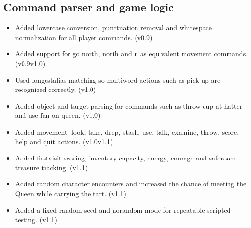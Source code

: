 \documentclass[letterpaper,10pt,english]{sphinxmanual}
\begin{document}
\subsection{Command parser and game logic}
\label{\detokenize{AssignmentFour/main:command-parser-and-game-logic}}\begin{itemize}
\item {} 
\sphinxAtStartPar
Added lowercase conversion, punctuation removal and whitespace normalization for all player commands. (v0.9)

\item {} 
\sphinxAtStartPar
Added support for go north, north and n as equivalent movement commands. (v0.9\sphinxhyphen{}v1.0)

\item {} 
\sphinxAtStartPar
Used longest\sphinxhyphen{}alias matching so multiword actions such as pick up are recognized correctly. (v1.0)

\item {} 
\sphinxAtStartPar
Added object and target parsing for commands such as throw cup at hatter and use fan on queen. (v1.0)

\item {} 
\sphinxAtStartPar
Added movement, look, take, drop, stash, use, talk, examine, throw, score, help and quit actions. (v1.0\sphinxhyphen{}v1.1)

\item {} 
\sphinxAtStartPar
Added first\sphinxhyphen{}visit scoring, inventory capacity, energy, courage and safe\sphinxhyphen{}room treasure tracking. (v1.1)

\item {} 
\sphinxAtStartPar
Added random character encounters and increased the chance of meeting the Queen while carrying the tart. (v1.1)

\item {} 
\sphinxAtStartPar
Added a fixed random seed and no\sphinxhyphen{}random mode for repeatable scripted testing. (v1.1)

\end{itemize}
\end{document}

